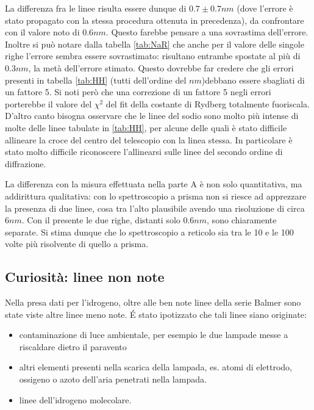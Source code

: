 \documentclass[a4paper,10pt]{article}
\begin{document}
{{{{{{{La differenza fra le linee risulta essere dunque di $0.7\pm 0.7 nm$ (dove l'errore è stato propagato con la stessa procedura ottenuta in precedenza), da confrontare con il valore noto di $0.6 nm$. Questo farebbe pensare a una sovrastima dell'errore. Inoltre si può notare dalla tabella \ref{tab:NaR} che anche per il valore delle singole righe l'errore sembra essere sovrastimato: risultano entrambe spostate al più di $0.3 nm$, la metà dell'errore stimato.
Questo dovrebbe far credere che gli errori presenti in tabella \ref{tab:HH} (tutti dell'ordine del $nm$)debbano essere sbagliati di un fattore 5. Si noti però che una correzione di un fattore 5 negli errori porterebbe il valore del $\chi^2$ del fit della costante di Rydberg totalmente fuoriscala. D'altro canto bisogna osservare che le linee del sodio sono molto più intense di molte delle linee tabulate in \ref{tab:HH}, per alcune delle quali è stato difficile allineare la croce del centro del telescopio con la linea stessa. In particolare è stato molto difficile riconoscere l'allinearsi sulle linee del secondo ordine di diffrazione.


La differenza con la misura effettuata nella parte A è non solo quantitativa, ma addirittura qualitativa: con lo spettroscopio a prisma non si riesce ad apprezzare la presenza di due linee, cosa tra l'alto plausibile avendo una risoluzione di circa $6 nm$. Con il presente le due righe, distanti solo $0.6 nm$, sono chiaramente separate. Si stima dunque che lo spettroscopio a reticolo sia tra le 10 e le 100 volte più risolvente di quello a prisma.  




\label{Curiosità: linee non note}\subsection{Curiosità: linee non note}
Nella presa dati per l'idrogeno, oltre alle ben note linee della serie Balmer sono state viste altre linee meno note. \'E stato ipotizzato che tali linee siano originate:
\begin{itemize}
\item contaminazione di luce ambientale, per esempio le due lampade messe a riscaldare dietro il paravento
\item altri elementi presenti nella scarica della lampada, es. atomi di elettrodo, ossigeno o azoto dell'aria penetrati nella lampada.
\item linee dell'idrogeno molecolare.
\end{itemize}

}}}}}}}
\end{document}
